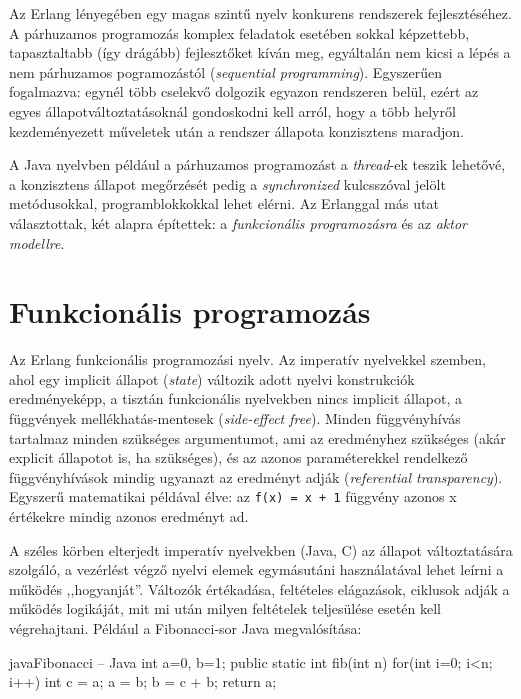 \documentclass[12pt, a4paper, oneside]{book}
\begin{document}
Az Erlang lényegében egy magas szintű nyelv konkurens rendszerek
fejlesztéséhez. A párhuzamos programozás komplex feladatok esetében sokkal
képzettebb, tapasztaltabb (így drágább) fejlesztőket kíván meg, egyáltalán nem
kicsi a lépés a nem párhuzamos pogramozástól (\emph{sequential programming}).
Egyszerűen fogalmazva: egynél több cselekvő dolgozik egyazon rendszeren belül,
ezért az egyes állapotváltoztatásoknál gondoskodni kell arról, hogy a több
helyről kezdeményezett műveletek után a rendszer állapota konzisztens maradjon.

A Java nyelvben például a párhuzamos programozást a \emph{thread}-ek teszik
lehetővé, a konzisztens állapot megőrzését pedig a \emph{synchronized}
kulcsszóval jelölt metódusokkal, programblokkokkal lehet elérni. Az Erlanggal
más utat választottak, két alapra építettek: a \emph{funkcionális
programozásra} és az \emph{aktor modellre}.
 
\section{Funkcionális programozás} 

Az Erlang funkcionális programozási nyelv. Az imperatív nyelvekkel szemben,
ahol egy implicit állapot (\emph{state}) változik adott nyelvi konstrukciók
eredményeképp, a tisztán funkcionális nyelvekben nincs implicit állapot, a
függvények mellékhatás-mentesek (\emph{side-effect free}). Minden függvényhívás
tartalmaz minden szükséges argumentumot, ami az eredményhez szükséges (akár
explicit állapotot is, ha szükséges), és az azonos paraméterekkel rendelkező
függvényhívások mindig ugyanazt az eredményt adják (\emph{referential
transparency}). Egyszerű matematikai példával élve: az \texttt{f(x) = x + 1}
függvény azonos x értékekre mindig azonos eredményt ad.

A széles körben elterjedt imperatív nyelvekben (Java, C) az állapot
változtatására szolgáló, a vezérlést végző nyelvi elemek egymásutáni
használatával lehet leírni a működés ,,hogyanját''. Változók értékadása,
feltételes elágazások, ciklusok adják a működés logikáját, mit mi után milyen
feltételek teljesülése esetén kell végrehajtani. Például a Fibonacci-sor Java
megvalósítása:

\begin{code}{java}{Fibonacci -- Java}
int a=0, b=1;
public static int fib(int n) {
  for(int i=0; i<n; i++) {
    int c = a;
    a = b;
    b = c + b;
  }
  return a;
}
\end{code}
\end{document}
